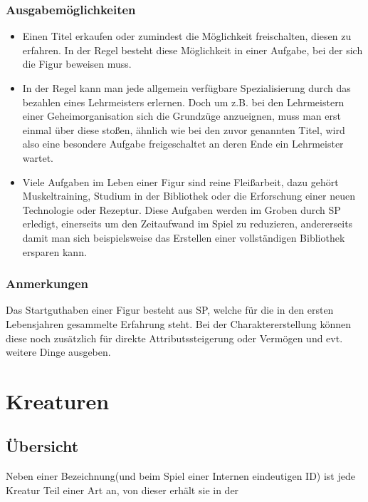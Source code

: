 \documentclass[a4paper,12pt,oneside]{book}
\begin{document}
\section{Ausgabemöglichkeiten}
\begin{itemize}
\item Einen Titel erkaufen oder zumindest die Möglichkeit freischalten, diesen zu erfahren. In der Regel besteht diese Möglichkeit in einer Aufgabe, bei der sich die Figur beweisen muss.
\item In der Regel kann man jede allgemein verfügbare Spezialisierung durch das bezahlen eines Lehrmeisters erlernen. Doch um z.B. bei den Lehrmeistern einer Geheimorganisation sich die Grundzüge anzueignen, muss man erst einmal über diese stoßen, ähnlich wie bei den zuvor genannten Titel, wird also eine besondere Aufgabe freigeschaltet an deren Ende ein Lehrmeister wartet.
\item Viele Aufgaben im Leben einer Figur sind reine Fleißarbeit, dazu gehört Muskeltraining, Studium in der Bibliothek oder die Erforschung einer neuen Technologie oder Rezeptur. Diese Aufgaben werden im Groben durch SP erledigt, einerseits um den Zeitaufwand im Spiel zu reduzieren, andererseits damit man sich beispielsweise das Erstellen einer vollständigen Bibliothek ersparen kann.
\end{itemize}
\section{Anmerkungen}
Das Startguthaben einer Figur besteht aus SP, welche für die in den ersten Lebensjahren gesammelte Erfahrung steht. Bei der Charaktererstellung können diese noch zusätzlich für direkte Attributssteigerung oder Vermögen und evt. weitere Dinge ausgeben.


\part{Kreaturen}
\setcounter{chapter}{0}
\chapter{Übersicht}
Neben einer Bezeichnung(und beim Spiel einer Internen eindeutigen ID) ist jede Kreatur Teil einer Art an, von dieser erhält sie in der 
\end{document}
